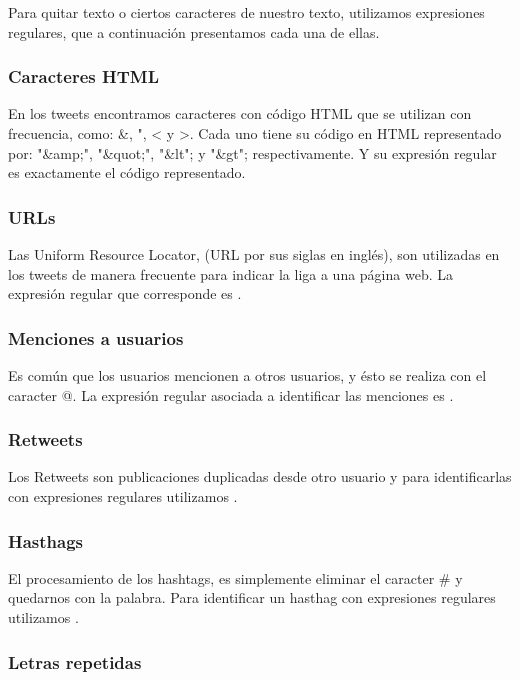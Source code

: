 \documentclass[sigconf, nonacm, spanish]{acmart}
\begin{document}
Para quitar texto o ciertos caracteres de nuestro texto, utilizamos expresiones regulares, que a continuación presentamos cada una de ellas.

\subsubsection{Caracteres HTML}

En los tweets encontramos caracteres con código HTML que se utilizan con frecuencia, como: \&, ", < y >. Cada uno tiene su código en HTML representado por: "\&amp;", "\&quot;", "\&lt"; y "\&gt"; respectivamente. Y su expresión regular es exactamente el código representado.

\subsubsection{URLs}

Las Uniform Resource Locator, (URL por sus siglas en inglés), son utilizadas en los tweets de manera frecuente para indicar la liga a una página web. La expresión regular que corresponde es .

\subsubsection{Menciones a usuarios}

Es común que los usuarios mencionen a otros usuarios, y ésto se realiza con el caracter @. La expresión regular asociada a identificar las menciones es .

\subsubsection{Retweets}

Los Retweets son publicaciones duplicadas desde otro usuario y para identificarlas con expresiones regulares utilizamos .

\subsubsection{Hasthags}

El procesamiento de los hashtags, es simplemente eliminar el caracter \# y quedarnos con la palabra. Para identificar un hasthag con expresiones regulares utilizamos .

\subsubsection{Letras repetidas}
\end{document}
